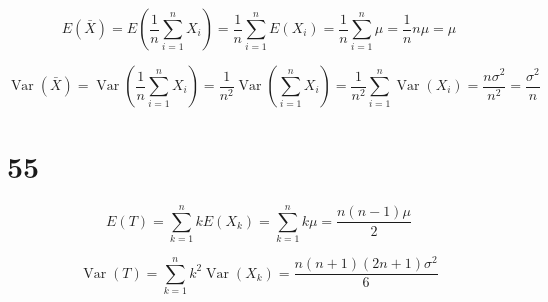 \documentclass[]{article}
\begin{document}
\[E(\bar{X})=E\left(\frac{1}{n}  \sum_{i=1}^{n} X_{i}\right)=\frac{1}{n} \sum_{i=1}^{n} E\left(X_{i}\right)=\frac{1}{n}  \sum_{i=1}^{n} \mu=\frac{1}{n}  n \mu=\mu\]

\[\operatorname{Var}(\bar{X})=\operatorname{Var}\left(\frac{1}{n}  \sum_{i=1}^{n} X_{i}\right)=\frac{1}{n^{2}}\operatorname{Var}\left(\sum_{i=1}^{n} X_{i}\right)=\frac{1}{n^{2}}\sum_{i=1}^{n} \operatorname{Var}\left(X_{i}\right)=\frac{n\sigma^2}{n^2}=\frac{\sigma^2}{n}\]

\section{55}\label{header-n62}

\[E(T)=\sum_{k=1}^{n}kE( X_k)=\sum_{k=1}^{n}k\mu=\frac{n(n-1)\mu}{2}\]

\[\operatorname{Var}(T)=\sum_{k=1}^{n}k^2\operatorname{Var}( X_k)=\frac{n(n+1)(2n+1)\sigma^2}{6}\]
\end{document}
